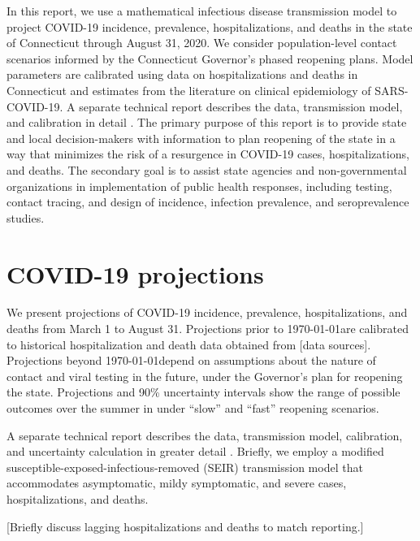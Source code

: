 \documentclass[11pt]{article}
\begin{document}

In this report, we use a mathematical infectious disease transmission model to project COVID-19 incidence, prevalence, hospitalizations, and deaths in the state of Connecticut through August 31, 2020.  We consider population-level contact scenarios informed by the Connecticut Governor's phased reopening plans.  Model parameters are calibrated using data on hospitalizations and deaths in Connecticut and estimates from the literature on clinical epidemiology of SARS-COVID-19.  A separate technical report describes the data, transmission model, and calibration in detail \citep{morozova2020tech}.  The primary purpose of this report is to provide state and local decision-makers with information to plan reopening of the state in a way that minimizes the risk of a resurgence in COVID-19 cases, hospitalizations, and deaths.  The secondary goal is to assist state agencies and non-governmental organizations in implementation of public health responses, including testing, contact tracing, and design of incidence, infection prevalence, and seroprevalence studies. 





\section*{COVID-19 projections} 

We present projections of COVID-19 incidence, prevalence, hospitalizations, and deaths from March 1 to August 31.  Projections prior to \today are calibrated to historical hospitalization and death data obtained from [data sources].  Projections beyond \today depend on assumptions about the nature of contact and viral testing in the future, under the Governor's plan for reopening the state.  Projections and 90\% uncertainty intervals show the range of possible outcomes over the summer in under ``slow'' and ``fast'' reopening scenarios.  

A separate technical report describes the data, transmission model, calibration, and uncertainty calculation in greater detail \citep{morozova2020tech}.  Briefly, we employ a modified susceptible-exposed-infectious-removed (SEIR) transmission model that accommodates asymptomatic, mildy symptomatic, and severe cases, hospitalizations, and deaths.  

[Briefly discuss lagging hospitalizations and deaths to match reporting.]
\end{document}
